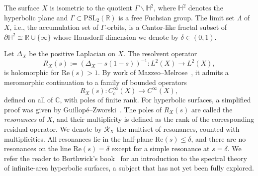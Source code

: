 \documentclass[12pt,letterpaper]{amsart}
\theoremstyle{plain}
\theoremstyle{definition}
\theoremstyle{remark}
\newcommand{\R}{\mathbb{R}}
\newcommand{\HH}{\mathbb{H}}
\newcommand{\CC}{\mathbb{C}}
\begin{document}
The surface $X$ is isometric to the quotient $\Gamma \backslash \mathbb{H}^2$, where $\mathbb{H}^2$ denotes the hyperbolic plane and $\Gamma \subset \mathrm{PSL}_2(\mathbb{R})$ is a free Fuchsian group. The limit set $\Lambda$ of $X$, i.e., the accumulation set of $\Gamma$-orbits, is a Cantor-like fractal subset of $\partial \HH^2 \cong \R\cup \{ \infty \}$ whose Hausdorff dimension we denote by $\delta\in (0,1).$

Let $\Delta_X$ be the positive Laplacian on $X.$ The resolvent operator
\[
R_X(s) := \left( \Delta_X - s(1 - s) \right)^{-1} \colon L^2(X) \to L^2(X),
\]
is holomorphic for \( \mathrm{Re}(s) > 1 \). By work of Mazzeo--Melrose~\cite{MM87}, it admits a meromorphic continuation to a family of bounded operators
\begin{equation} \label{resolvent_continued}
R_X(s) \colon C_c^\infty(X) \to C^\infty(X),
\end{equation}
defined on all of \( \CC \), with poles of finite rank. For hyperbolic surfaces, a simplified proof was given by Guillop\'e--Zworski~\cite{GZ95}. The poles of \( R_X(s) \) are called the \textit{resonances} of \( X \), and their multiplicity is defined as the rank of the corresponding residual operator. We denote by \( \mathcal{R}_X \) the multiset of resonances, counted with multiplicities. All resonances lie in the half-plane \( \mathrm{Re}(s) \le \delta \), and there are no resonances on the line \( \mathrm{Re}(s) = \delta \) except for a simple resonance at \( s = \delta \). We refer the reader to Borthwick's book~\cite{Borthwick_book} for an introduction to the spectral theory of infinite-area hyperbolic surfaces, a subject that has not yet been fully explored.
\end{document}
